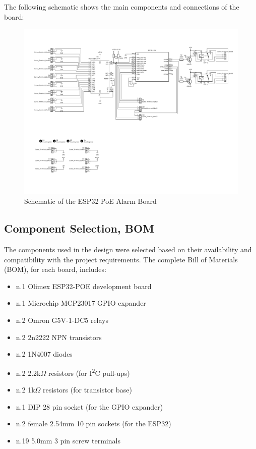 \documentclass[a4paper,12pt]{article}
\begin{document}
The following schematic shows the main components and connections of the board:
\begin{figure}[H]
    \centering
    \includegraphics[width=\textwidth]{Media/Schematic.pdf}
    \caption{Schematic of the ESP32 PoE Alarm Board}
    \label{fig:schematic}
\end{figure}

\subsection{Component Selection, BOM}
The components used in the design were selected based on their availability and compatibility with the project requirements. The complete Bill of Materials (BOM), for each board, includes:

\begin{itemize}
    \item n.1 Olimex ESP32-POE development board
    \item n.1 Microchip MCP23017 GPIO expander
    \item n.2 Omron G5V-1-DC5 relays
    \item n.2 2n2222 NPN transistors
    \item n.2 1N4007 diodes
    \item n.2 2.2k$\Omega$ resistors (for I\textsuperscript{2}C pull-ups)
    \item n.2 1k$\Omega$ resistors (for transistor base)
    \item n.1 DIP 28 pin socket (for the GPIO expander)
    \item n.2 female 2.54mm 10 pin sockets (for the ESP32)
    \item n.19 5.0mm 3 pin screw terminals
\end{itemize}
\end{document}
